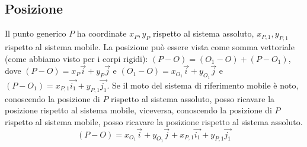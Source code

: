 \subsection{Posizione}
Il punto generico $P$ ha coordinate $x_P, y_P$ rispetto al sistema assoluto, $x_{P,1}, y_{P,1}$ rispetto al sistema mobile. \newline
La posizione può essere vista come somma vettoriale (come abbiamo visto per i corpi rigidi): $(P-O) = (O_1 - O) + (P-O_1)$, dove $(P-O) = x_P \vec{i} + y_P \vec{j}$ e $(O_1 - O) = x_{O_1} \vec{i} + y_{O_1} \vec{j}$ e $(P-O_1) = x_{P,1} \vec{i_1} + y_{P,1} \vec{j_1}$. Se il moto del sistema di riferimento mobile è noto, conoscendo la posizione di $P$ rispetto al sistema assoluto, posso ricavare la posizione rispetto al sistema mobile, viceversa, conoscendo la posizione di $P$ rispetto al sistema mobile, posso ricavare la posizione rispetto al sistema assoluto.
\[
    (P-O) = x_{O_1}\vec{i} + y_{O_1}\vec{j} + x_{P,1} \vec{i_1} + y_{P,1} \vec{j_1}
\]
